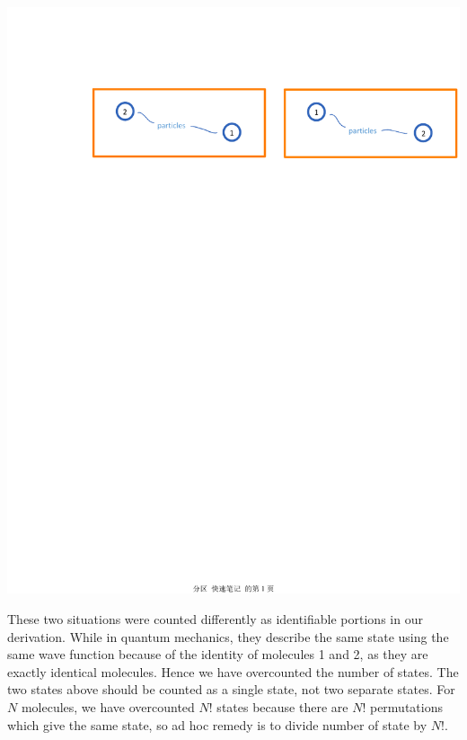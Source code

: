 \documentclass[11pt,oneside]{book}
\theoremstyle{break}
\theoremstyle{break}
\begin{document}
\begin{center}
\includegraphics[scale=0.69]{gibbsPar.pdf}
\end{center}

These two situations were counted differently as identifiable portions in our derivation. While in quantum mechanics, they describe the same state using the same wave function because of the identity of molecules 1 and 2, as they are exactly identical molecules. Hence we have overcounted the number of states. The two states above should be counted as a single state, not two separate states. For $N$ molecules, we have overcounted $N!$ states because there are $N!$ permutations which give the same state, so ad hoc remedy is to divide number of state by $N!$. \\
\end{document}
